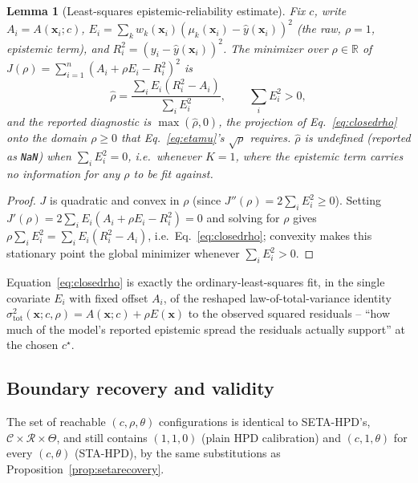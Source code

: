 \documentclass[10pt,twocolumn,a4paper]{article}
\newtheorem{lemma}{Lemma}
\begin{document}
\begin{lemma}[Least-squares epistemic-reliability estimate]
\label{lem:closedrho}
Fix $c$, write $A_i=A(\bm x_i;c)$, $E_i=\sum_k w_k(\bm x_i)(\mu_k(\bm x_i)-\hat y(\bm x_i))^2$ (the
\emph{raw}, $\rho=1$, epistemic term), and $R_i^2=(y_i-\hat y(\bm x_i))^2$. The minimizer over
$\rho\in\mathbb R$ of $J(\rho)=\sum_{i=1}^n (A_i+\rho E_i - R_i^2)^2$ is
\begin{equation}
\hat\rho = \frac{\sum_i E_i(R_i^2-A_i)}{\sum_i E_i^2}, \qquad \sum_i E_i^2>0,
\label{eq:closedrho}
\end{equation}
and the reported diagnostic is $\max(\hat\rho,0)$, the projection of Eq.~\eqref{eq:closedrho} onto
the domain $\rho\ge0$ that Eq.~\eqref{eq:etamu}'s $\sqrt\rho$ requires. $\hat\rho$ is undefined
(reported as \texttt{NaN}) when $\sum_i E_i^2=0$, i.e.\ whenever $K=1$, where the epistemic term
carries no information for any $\rho$ to be fit against.
\end{lemma}
\begin{proof}
$J$ is quadratic and convex in $\rho$ (since $J''(\rho)=2\sum_i E_i^2\ge0$). Setting
$J'(\rho)=2\sum_i E_i(A_i+\rho E_i - R_i^2)=0$ and solving for $\rho$ gives
$\rho\sum_i E_i^2=\sum_i E_i(R_i^2-A_i)$, i.e.\ Eq.~\eqref{eq:closedrho}; convexity makes this
stationary point the global minimizer whenever $\sum_i E_i^2>0$.
\end{proof}

Equation~\eqref{eq:closedrho} is exactly the ordinary-least-squares fit, in the single covariate
$E_i$ with fixed offset $A_i$, of the reshaped law-of-total-variance identity
$\sigma_{\mathrm{tot}}^2(\bm x;c,\rho)=A(\bm x;c)+\rho E(\bm x)$ to the observed squared residuals --
``how much of the model's reported epistemic spread the residuals actually support'' at the chosen
$c^\star$.

\subsection{Boundary recovery and validity}
The set of reachable $(c,\rho,\theta)$ configurations is identical to SETA-HPD's,
$\mathcal C\times\mathcal R\times\Theta$, and still contains $(1,1,0)$ (plain HPD calibration) and
$(c,1,\theta)$ for every $(c,\theta)$ (STA-HPD), by the same substitutions as
Proposition~\ref{prop:setarecovery}.
\end{document}
